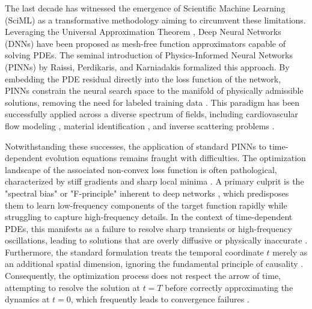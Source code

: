\documentclass[11pt,reqno]{amsart}
\theoremstyle{plain}
\theoremstyle{definition}
\theoremstyle{remark}
\begin{document}
The last decade has witnessed the emergence of Scientific Machine Learning (SciML) as a transformative methodology aiming to circumvent these limitations. Leveraging the Universal Approximation Theorem \cite{cybenko1989, hornik1991}, Deep Neural Networks (DNNs) have been proposed as mesh-free function approximators capable of solving PDEs. The seminal introduction of Physics-Informed Neural Networks (PINNs) by Raissi, Perdikaris, and Karniadakis \cite{raissi2019physics, raissi2017I, raissi2017II} formalized this approach. By embedding the PDE residual directly into the loss function of the network, PINNs constrain the neural search space to the manifold of physically admissible solutions, removing the need for labeled training data \cite{karniadakis2021}. This paradigm has been successfully applied across a diverse spectrum of fields, including cardiovascular flow modeling \cite{kissas2020}, material identification \cite{shukla2020}, and inverse scattering problems \cite{lu2019}.

Notwithstanding these successes, the application of standard PINNs to time-dependent evolution equations remains fraught with difficulties. The optimization landscape of the associated non-convex loss function is often pathological, characterized by stiff gradients and sharp local minima \cite{wang2021understanding}. A primary culprit is the "spectral bias" or "F-principle" inherent to deep networks \cite{rahaman2019, xu2019}, which predisposes them to learn low-frequency components of the target function rapidly while struggling to capture high-frequency details. In the context of time-dependent PDEs, this manifests as a failure to resolve sharp transients or high-frequency oscillations, leading to solutions that are overly diffusive or physically inaccurate \cite{wang2022and}. Furthermore, the standard formulation treats the temporal coordinate $t$ merely as an additional spatial dimension, ignoring the fundamental principle of causality \cite{wang2021failure}. Consequently, the optimization process does not respect the arrow of time, attempting to resolve the solution at $t=T$ before correctly approximating the dynamics at $t=0$, which frequently leads to convergence failures \cite{krishnapriyan2021, daw2023}.
\end{document}
